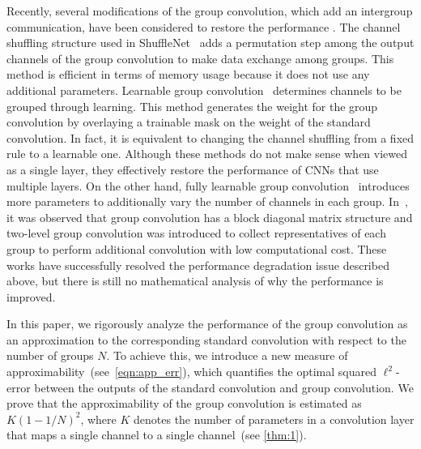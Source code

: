 \documentclass[preprint,12pt,authoryear]{elsarticle}
\numberwithin{equation}{section}
\theoremstyle{remark}
\begin{document}
Recently, several modifications of the group convolution, which add an intergroup communication, have been considered to restore the performance \citep{chollet2017xception,lee2022two,long2015fully,zhang2018shufflenet}.
The channel shuffling structure used in ShuffleNet~\citep{zhang2018shufflenet} adds a permutation step among the output channels of the group convolution to make data exchange among groups.
This method is efficient in terms of memory usage because it does not use any additional parameters.
Learnable group convolution~\citep{Huang_2018_CVPR} determines channels to be grouped through learning.
This method generates the weight for the group convolution by overlaying a trainable mask on the weight of the standard convolution.
In fact, it is equivalent to changing the channel shuffling from a fixed rule to a learnable one.
Although these methods do not make sense when viewed as a single layer, they effectively restore the performance of CNNs that use multiple layers.
On the other hand, fully learnable group convolution~\citep{zhang2018shufflenet} introduces more parameters to additionally vary the number of channels in each group.
In~\citep{lee2022two}, it was observed that group convolution has a block diagonal matrix structure and two-level group convolution was introduced to collect representatives of each group to perform additional convolution with low computational cost.
These works have successfully resolved the performance degradation issue described above, but there is still no mathematical analysis of why the performance is improved.

In this paper, we rigorously analyze the performance of the group convolution as an approximation to the corresponding standard convolution with respect to the number of groups $N$.
To achieve this, we introduce a new measure of approximability~(see~\eqref{eqn:app_err}), which quantifies the optimal squared $\ell^2$-error between the outputs of the standard convolution and group convolution.
We prove that the approximability of the group convolution is estimated as $K(1 - 1/N)^{2}$, where $K$ denotes the number of parameters in a convolution layer that maps a single channel to a single channel~(see \cref{thm:1}).
\end{document}
